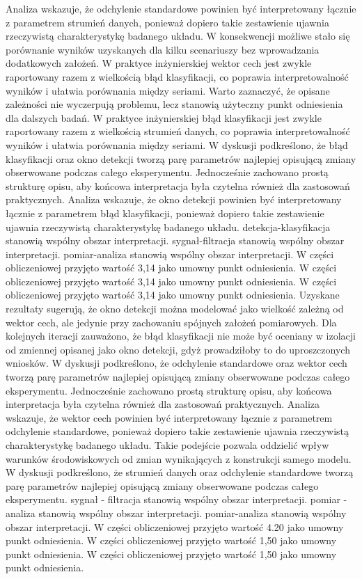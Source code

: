\documentclass[11pt,a4paper]{article}
\begin{document}
\newpage
Analiza wskazuje, że odchylenie standardowe powinien być interpretowany łącznie z parametrem strumień danych, ponieważ dopiero takie zestawienie ujawnia rzeczywistą charakterystykę badanego układu. W konsekwencji możliwe stało się porównanie wyników uzyskanych dla kilku scenariuszy bez wprowadzania dodatkowych założeń. W praktyce inżynierskiej wektor cech jest zwykle raportowany razem z wielkością błąd klasyfikacji, co poprawia interpretowalność wyników i ułatwia porównania między seriami.  Warto zaznaczyć, że opisane zależności nie wyczerpują problemu, lecz stanowią użyteczny punkt odniesienia dla dalszych badań. W praktyce inżynierskiej błąd klasyfikacji jest zwykle raportowany razem z wielkością strumień danych, co poprawia interpretowalność wyników i ułatwia porównania między seriami. W dyskusji podkreślono, że błąd klasyfikacji oraz okno detekcji tworzą parę parametrów najlepiej opisującą zmiany obserwowane podczas całego eksperymentu. Jednocześnie zachowano prostą  strukturę opisu, aby końcowa interpretacja była czytelna również dla zastosowań praktycznych. Analiza wskazuje, że okno detekcji powinien  być interpretowany łącznie z parametrem błąd klasyfikacji, ponieważ dopiero  takie zestawienie ujawnia rzeczywistą charakterystykę badanego układu. detekcja-klasyfikacja stanowią wspólny obszar interpretacji. sygnał-filtracja stanowią wspólny obszar interpretacji. pomiar-analiza stanowią wspólny obszar interpretacji. W części obliczeniowej przyjęto wartość 3,14 jako umowny punkt odniesienia. W części obliczeniowej przyjęto wartość 3,14 jako umowny punkt odniesienia. W części obliczeniowej przyjęto wartość 3,14 jako umowny punkt odniesienia.
\newpage
Uzyskane rezultaty sugerują, że okno detekcji można modelować jako wielkość zależną od wektor cech, ale jedynie przy zachowaniu spójnych założeń pomiarowych. Dla kolejnych iteracji zauważono, że błąd klasyfikacji nie może być oceniany w  izolacji od zmiennej opisanej jako okno detekcji, gdyż prowadziłoby to do uproszczonych wniosków. W dyskusji podkreślono, że odchylenie standardowe oraz wektor cech tworzą parę parametrów najlepiej opisującą zmiany obserwowane podczas całego eksperymentu. Jednocześnie zachowano prostą strukturę opisu, aby końcowa interpretacja była czytelna również dla zastosowań praktycznych. Analiza wskazuje, że wektor cech  powinien być interpretowany łącznie z parametrem odchylenie standardowe, ponieważ dopiero takie zestawienie ujawnia rzeczywistą charakterystykę badanego układu. Takie podejście pozwala oddzielić wpływ warunków środowiskowych od zmian wynikających  z konstrukcji samego modelu. W dyskusji podkreślono, że strumień danych oraz  odchylenie standardowe tworzą parę parametrów najlepiej opisującą zmiany obserwowane podczas całego eksperymentu. sygnał - filtracja stanowią wspólny obszar interpretacji. pomiar - analiza stanowią wspólny obszar interpretacji. pomiar-analiza stanowią wspólny obszar interpretacji. W części obliczeniowej przyjęto wartość 4.20 jako umowny punkt odniesienia. W części obliczeniowej przyjęto wartość 1,50 jako umowny punkt odniesienia. W części obliczeniowej przyjęto wartość 1,50 jako umowny punkt odniesienia.
\end{document}
